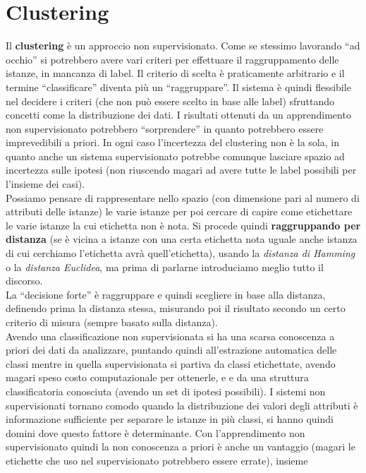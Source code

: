 \documentclass[a4paper,12pt, oneside]{book}
\begin{document}
\chapter{Clustering}
Il \textbf{clustering} è un approccio non supervisionato. Come se stessimo
lavorando ``ad occhio'' si potrebbero avere vari criteri per effettuare il
raggruppamento delle istanze, in mancanza di label. Il criterio di scelta è
praticamente arbitrario e il termine ``classificare'' diventa più un
``raggruppare''. Il sistema è quindi flessibile nel decidere i criteri (che non
può essere scelto in base alle label) sfruttando concetti come la distribuzione
dei dati. I risultati ottenuti da un apprendimento
non supervisionato potrebbero ``sorprendere'' in quanto potrebbero essere
imprevedibili a priori. In ogni caso l'incertezza del clustering non è la sola,
in quanto anche un sistema supervisionato potrebbe comunque lasciare spazio ad
incertezza sulle ipotesi (non riuscendo magari ad avere tutte le label possibili
per l'insieme dei casi).\\ 
Possiamo pensare di rappresentare nello spazio (con dimensione pari al numero di
attributi delle istanze) le varie istanze per poi cercare di capire come
etichettare le varie istanze la cui etichetta non è nota. Si procede quindi
\textbf{raggruppando per distanza} (se è vicina a istanze con una certa
etichetta nota uguale anche istanza di cui cerchiamo l'etichetta avrà
quell'etichetta), usando la \textit{distanza di Hamming} o la \textit{distanza
  Euclidea}, ma prima di parlarne introduciamo meglio tutto il discorso. \\
La ``decisione forte'' è raggruppare e quindi scegliere in base alla distanza,
definendo prima la distanza stessa, misurando poi il risultato secondo un certo
criterio di misura (sempre basato sulla distanza).\\
Avendo una classificazione non supervisionata si ha una scarsa conoscenza a
priori dei dati da analizzare, puntando quindi all'estrazione automatica delle
classi mentre in quella supervisionata si partiva da classi etichettate, avendo
magari speso costo computazionale per ottenerle, e e da una struttura
classificatoria conosciuta (avendo un set di ipotesi possibili). I sistemi non
supervisionati tornano comodo quando la distribuzione dei valori degli attributi
è informazione sufficiente per separare le istanze in più classi, si hanno
quindi domini dove questo fattore è determinante. Con l'apprendimento non
supervisionato quindi la non conoscenza a priori è anche un vantaggio (magari le
etichette che uso nel supervisionato potrebbero essere errate), insieme
\end{document}

